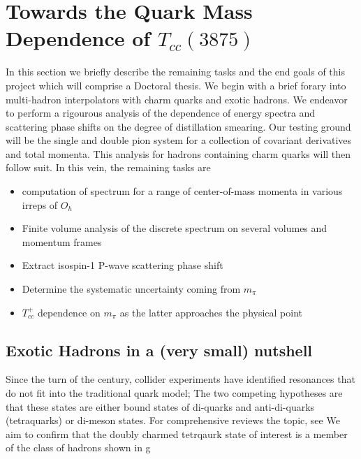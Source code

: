 
\chapter{Towards the Quark Mass Dependence of $T_{cc}(3875)$}
\label{sec:tcc}

In this section we briefly describe the remaining tasks and the end goals of this project which will comprise a Doctoral thesis. We begin with a brief forary into multi-hadron interpolators with charm quarks and exotic hadrons. We endeavor to perform a rigourous analysis of the dependence of energy spectra and scattering phase shifts on the degree of distillation smearing. Our testing ground will be the single and double pion system for a collection of covariant derivatives and total momenta. This analysis for hadrons containing charm quarks will then follow suit. In this vein, the remaining tasks are 
\begin{itemize}
    \item computation of spectrum for a range of center-of-mass momenta in various irreps of $O_h$
    \item Finite volume analysis of the discrete spectrum on several volumes and momentum frames
    \item Extract isospin-1 P-wave scattering phase shift 
    \item Determine the systematic uncertainty coming from $m_\pi$ 
    \item $T_{cc}^+$ dependence on $m_\pi$ as the latter approaches the physical point
\end{itemize}


\section{Exotic Hadrons in a (very small) nutshell}
Since the turn of the century, collider experiments have identified resonances that do not fit into the traditional quark model; The two competing hypotheses are that these states are either bound states of di-quarks and anti-di-quarks (tetraquarks) or di-meson states. 
For comprehensive reviews the topic, see \cite{Chen}\cite{Guo:2017jvc} \cite{Brambilla:2019esw}We aim to confirm that the doubly charmed tetrqaurk state of interest is a member of the class of hadrons shown in g

